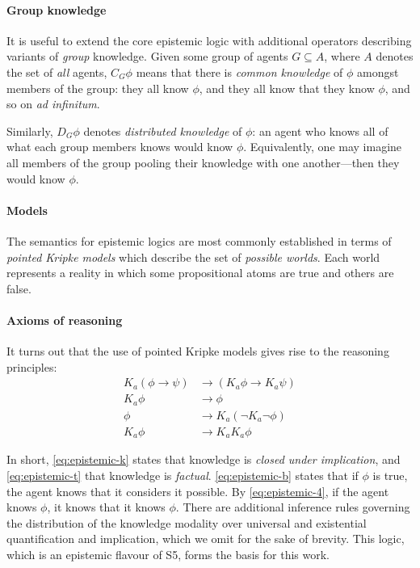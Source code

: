 \documentclass[letterpaper,twocolumn,10pt]{article}
\begin{document}
\paragraph{Group knowledge}
It is useful to extend the core epistemic logic with additional operators describing variants of \emph{group} knowledge.
Given some group of agents \(G \subseteq A\), where \(A\) denotes the set of \emph{all} agents, \(C_G \phi\) means that there is \emph{common knowledge} of \(\phi\) amongst members of the group:
they all know \(\phi\), and they all know that they know \(\phi\), and so on \emph{ad infinitum}.

Similarly, \(D_G \phi\) denotes \emph{distributed knowledge} of \(\phi\):
an agent who knows all of what each group members knows would know \(\phi\).
Equivalently, one may imagine all members of the group pooling their knowledge with one another---then they would know \(\phi\).

\paragraph{Models}
The semantics for epistemic logics are most commonly established in terms of \emph{pointed Kripke models} which describe the set of \emph{possible worlds}.
Each world represents a reality in which some propositional atoms are true and others are false.

\paragraph{Axioms of reasoning}
It turns out that the use of pointed Kripke models gives rise to the reasoning principles:
%
\begin{align}
  K_a (\phi \to \psi) &\to (K_a \phi \to K_a \psi) \label{eq:epistemic-k} \tag{K} \\
  K_a \phi &\to \phi \tag{T} \label{eq:epistemic-t} \\
  \phi &\to K_a (\lnot K_a \lnot \phi) \label{eq:epistemic-b} \tag{B} \\
  K_a \phi &\to K_a K_a \phi \label{eq:epistemic-4} \tag{4}
\end{align}

In short, \cref{eq:epistemic-k} states that knowledge is \emph{closed under implication}, and \cref{eq:epistemic-t} that knowledge is \emph{factual}.
\cref{eq:epistemic-b} states that if \(\phi\) is true, the agent knows that it considers it possible.
By \cref{eq:epistemic-4}, if the agent knows \(\phi\), it knows that it knows \(\phi\).
There are additional inference rules governing the distribution of the knowledge modality over universal and existential quantification and implication, which we omit for the sake of brevity.
This logic, which is an epistemic flavour of S5, forms the basis for this work.
\end{document}
